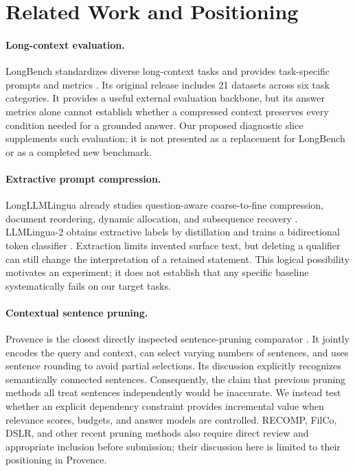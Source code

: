 \documentclass[10pt,twocolumn]{article}
\begin{document}
\section{Related Work and Positioning}
\paragraph{Long-context evaluation.}
LongBench standardizes diverse long-context tasks and provides task-specific prompts and metrics \cite{longbench}. Its original release includes 21 datasets across six task categories. It provides a useful external evaluation backbone, but its answer metrics alone cannot establish whether a compressed context preserves every condition needed for a grounded answer. Our proposed diagnostic slice supplements such evaluation; it is not presented as a replacement for LongBench or as a completed new benchmark.

\paragraph{Extractive prompt compression.}
LongLLMLingua already studies question-aware coarse-to-fine compression, document reordering, dynamic allocation, and subsequence recovery \cite{longlingua}. LLMLingua-2 obtains extractive labels by distillation and trains a bidirectional token classifier \cite{lingua2}. Extraction limits invented surface text, but deleting a qualifier can still change the interpretation of a retained statement. This logical possibility motivates an experiment; it does not establish that any specific baseline systematically fails on our target tasks.

\paragraph{Contextual sentence pruning.}
Provence is the closest directly inspected sentence-pruning comparator \cite{provence}. It jointly encodes the query and context, can select varying numbers of sentences, and uses sentence rounding to avoid partial selections. Its discussion explicitly recognizes semantically connected sentences. Consequently, the claim that previous pruning methods all treat sentences independently would be inaccurate. We instead test whether an explicit dependency constraint provides incremental value when relevance scores, budgets, and answer models are controlled. RECOMP, FilCo, DSLR, and other recent pruning methods also require direct review and appropriate inclusion before submission; their discussion here is limited to their positioning in Provence.
\end{document}
